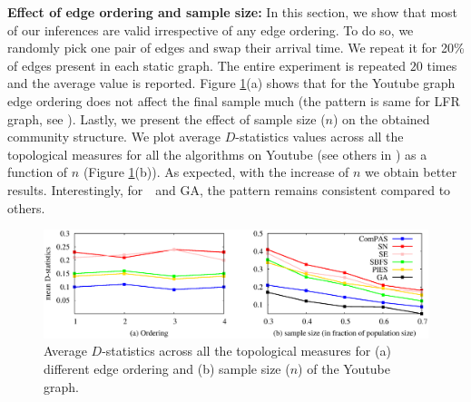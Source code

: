 {\bf Effect of edge ordering and sample size:}
In this section, we show that most of our inferences are valid irrespective of any edge ordering. To do so, we randomly pick one pair of edges and swap their arrival time. We repeat it for 20\% of  edges present in each static graph. The entire experiment is repeated $20$ times and the average value is reported. Figure \ref{param_est_1}(a) shows that for the Youtube graph edge ordering does not affect   the final  sample much (the pattern is same for LFR graph, see \cite{si}).
Lastly, we present the effect of sample size ($n$) on the obtained community structure. We plot average $D$-statistics values across all the topological measures for all the algorithms on Youtube  (see others in \cite{si}) as a function of $n$ (Figure \ref{param_est_1}(b)). As expected, with the increase of $n$ we obtain better results. Interestingly, for~\compas~and GA, the pattern remains consistent compared to others.\\

\begin{figure}[!h]
\centering
\includegraphics[width=\columnwidth]{./texfiles/Chapter_2/figures/param_estimate_1.eps}
\caption{\label{param_est_1}Average $D$-statistics across all the topological measures for (a) different edge ordering and (b) sample size ($n$) of the Youtube graph.}
\end{figure}







